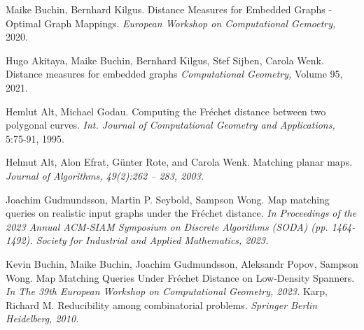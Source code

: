 \documentclass[a4paper, 12pt, twoside]{article}
\theoremstyle{Format1} %
\begin{document}
\begin{thebibliography}{3}
		Maike Buchin, Bernhard Kilgus. Distance Measures for Embedded Graphs - Optimal Graph Mappings.
		\textit{European Workshop on Computational Gemoetry,} 2020.

		Hugo Akitaya, Maike Buchin, Bernhard Kilgus, Stef Sijben, Carola Wenk. Distance measures for embedded graphs
		\textit{Computational Geometry,} Volume 95, 2021.

		Hemlut Alt, Michael Godau. Computing the Fréchet distance between two polygonal curves.
		\textit{Int. Journal of Computational Geometry and Applications,} 5:75-91, 1995.

		Helmut Alt, Alon Efrat, Günter Rote, and Carola Wenk. Matching planar maps.
		\textit{Journal of Algorithms, 49(2):262 – 283, 2003.}

		Joachim Gudmundsson, Martin P. Seybold, Sampson Wong. Map matching queries on realistic input graphs under the Fréchet distance.
		\textit{In Proceedings of the 2023 Annual ACM-SIAM Symposium on Discrete Algorithms (SODA) (pp. 1464-1492). Society for Industrial and Applied Mathematics, 2023.}

		Kevin Buchin, Maike Buchin, Joachim Gudmundsson, Aleksandr Popov, Sampson Wong. Map Matching Queries Under Fréchet Distance on Low-Density Spanners.
		\textit{In The 39th European Workshop on Computational Geometry, 2023.}
		Karp, Richard M. Reducibility among combinatorial problems.
		\textit{Springer Berlin Heidelberg, 2010.}

\end{thebibliography}


\end{document}
